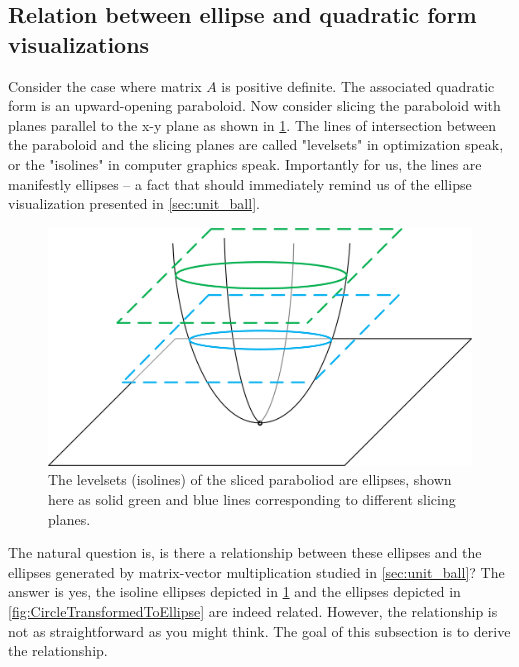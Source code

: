 \documentclass[onefignum,onetabnum]{siamart190516}
\begin{document}

\subsection{Relation between ellipse and quadratic form visualizations}
Consider the case where matrix $A$ is positive definite.  The associated quadratic
form is an upward-opening paraboloid.  Now consider slicing the paraboloid with
planes parallel to the x-y plane as shown in \cref{fig:LevelsetsOfParabola}.  The
lines of intersection between the paraboloid and the slicing planes are called 
"levelsets" in optimization speak, or the "isolines" in computer graphics speak.  
Importantly for us, the lines are manifestly ellipses -- a fact that should
immediately remind us of the ellipse visualization presented in \cref{sec:unit_ball}.
\begin{figure}[thb]
	\centering
	\includegraphics[width=0.7\columnwidth]{LevelsetsOfParabola.png}
	\caption{The levelsets (isolines) of the sliced paraboliod are
		ellipses, shown here as solid green and blue lines corresponding
		to different slicing planes.}
	\label{fig:LevelsetsOfParabola}
\end{figure}
The natural question is, is there a relationship between these ellipses and 
the ellipses generated by matrix-vector multiplication studied in \cref{sec:unit_ball}?
The answer is yes, the isoline ellipses depicted in \cref{fig:LevelsetsOfParabola} 
and the ellipses depicted in 
\cref{fig:CircleTransformedToEllipse} are indeed related.
However, the relationship is not as straightforward
as you might think.  The goal of this subsection is to derive the relationship.
\end{document}
